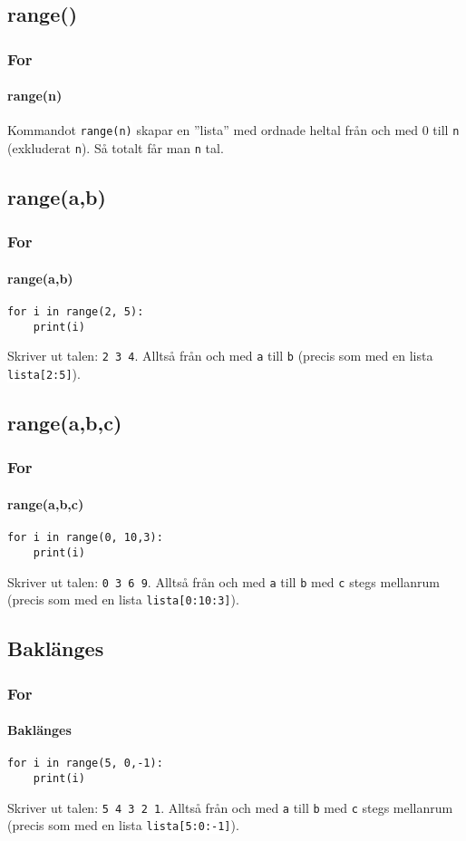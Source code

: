 \documentclass[aspectratio=169]{beamer}
\newcommand{\code}[1]{\colorbox{white}{\lstinline{#1}}}
\begin{document}
\subsection{range()}

\begin{frame}[fragile]
	\frametitle{For}
	\framesubtitle{range(n)}
	
	Kommandot \code{range(n)} skapar en ''lista'' med ordnade heltal från och med 0 till \code{n} (exkluderat \code{n}). Så totalt får man \code{n} tal.
	
\end{frame}

\subsection{range(a,b)}

\begin{frame}[fragile]
	\frametitle{For}
	\framesubtitle{range(a,b)}
	
	\begin{lstlisting}
for i in range(2, 5):
    print(i)
	\end{lstlisting}
	
	Skriver ut talen: \texttt{2 3 4}. Alltså från och med \texttt{a} till \texttt{b} (precis som med en lista \code{lista[2:5]}).
	
\end{frame}

\subsection{range(a,b,c)}

\begin{frame}[fragile]
	\frametitle{For}
	\framesubtitle{range(a,b,c)}
	
	\begin{lstlisting}
for i in range(0, 10,3):
    print(i)
	\end{lstlisting}
	
	Skriver ut talen: \texttt{0 3 6 9}. Alltså från och med \texttt{a} till \texttt{b} med \texttt{c} stegs mellanrum (precis som med en lista \code{lista[0:10:3]}).
	
\end{frame}

\subsection{Baklänges}

\begin{frame}[fragile]
	\frametitle{For}
	\framesubtitle{Baklänges}
	
	\begin{lstlisting}
for i in range(5, 0,-1):
    print(i)
	\end{lstlisting}
	
	Skriver ut talen: \texttt{5 4 3 2 1}. Alltså från och med \texttt{a} till \texttt{b} med \texttt{c} stegs mellanrum (precis som med en lista \code{lista[5:0:-1]}).
	
\end{frame}
\end{document}
